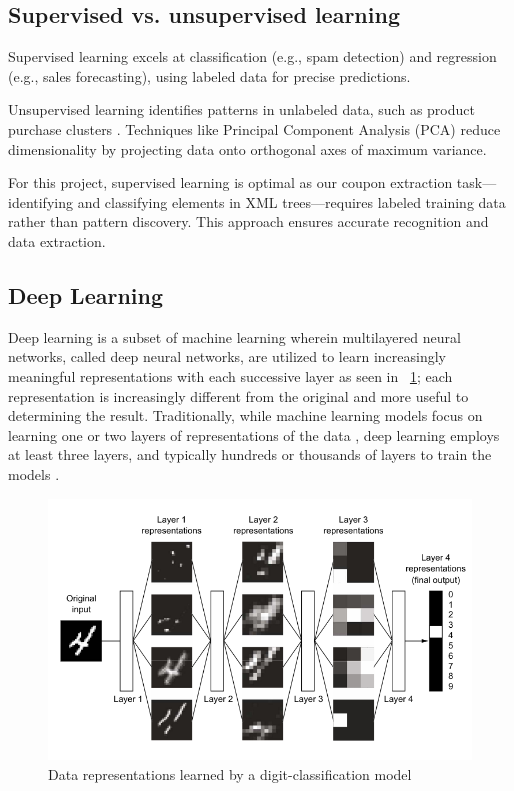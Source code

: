 \documentclass[licencjacka,en]{pracamgr}
\begin{document}
\subsection{Supervised vs. unsupervised learning}
Supervised learning excels at classification (e.g., spam detection) and regression (e.g., sales forecasting), using labeled data for precise predictions.

Unsupervised learning identifies patterns in unlabeled data, such as product purchase clusters \cite{supervised_ibm}. Techniques like Principal Component Analysis (PCA) \cite{PCA} reduce dimensionality by projecting data onto orthogonal axes of maximum variance.

For this project, supervised learning is optimal as our coupon extraction task—identifying and classifying elements in XML trees—requires labeled training data rather than pattern discovery. This approach ensures accurate recognition and data extraction.

\subsection{Deep Learning}
Deep learning is a subset of machine learning wherein multilayered neural networks, called deep neural networks, are utilized to learn increasingly meaningful representations with each successive layer as seen in ~\ref{fig:nn_simple}; each representation is increasingly different from the original and more useful to determining the result. Traditionally, while machine learning models focus on learning one or two layers of representations of the data \cite{francuz_8}, deep learning employs at least three layers, and typically hundreds or thousands of layers to train the models \cite{ibm_dl}.

\begin{figure}
    \centering
    \includegraphics[width=0.5\linewidth]{bachelor_images/nn_simple.png}
    \caption{Data representations learned by a digit-classification model \cite{francuz_8}}
    \label{fig:nn_simple}
\end{figure}
\end{document}
